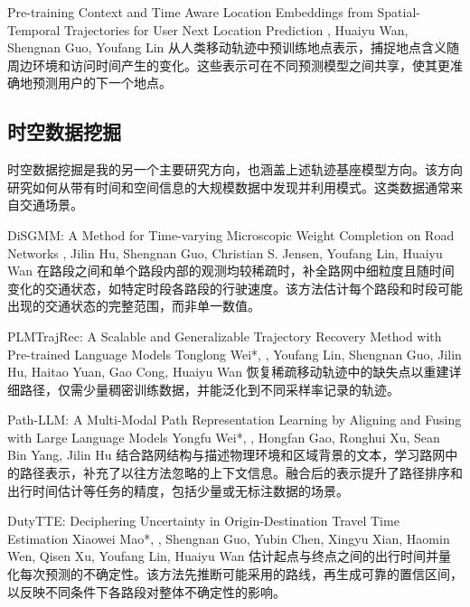 {Pre-training Context and Time Aware Location Embeddings from Spatial-Temporal Trajectories for User Next Location Prediction}
{\me, Huaiyu Wan, Shengnan Guo, Youfang Lin}
{从人类移动轨迹中预训练地点表示，捕捉地点含义随周边环境和访问时间产生的变化。这些表示可在不同预测模型之间共享，使其更准确地预测用户的下一个地点。}

\subsection*{时空数据挖掘}
时空数据挖掘是我的另一个主要研究方向，也涵盖上述轨迹基座模型方向。该方向研究如何从带有时间和空间信息的大规模数据中发现并利用模式。这类数据通常来自交通场景。

{DiSGMM: A Method for Time-varying Microscopic Weight Completion on Road Networks}
{\me, Jilin Hu, Shengnan Guo, Christian S. Jensen, Youfang Lin, Huaiyu Wan}
{在路段之间和单个路段内部的观测均较稀疏时，补全路网中细粒度且随时间变化的交通状态，如特定时段各路段的行驶速度。该方法估计每个路段和时段可能出现的交通状态的完整范围，而非单一数值。}

{PLMTrajRec: A Scalable and Generalizable Trajectory Recovery Method with Pre-trained Language Models}
{Tonglong Wei*, \me*, Youfang Lin, Shengnan Guo, Jilin Hu, Haitao Yuan, Gao Cong, Huaiyu Wan}
{恢复稀疏移动轨迹中的缺失点以重建详细路径，仅需少量稠密训练数据，并能泛化到不同采样率记录的轨迹。}

{Path-LLM: A Multi-Modal Path Representation Learning by Aligning and Fusing with Large Language Models}
{Yongfu Wei*, \me*, Hongfan Gao, Ronghui Xu, Sean Bin Yang, Jilin Hu}
{结合路网结构与描述物理环境和区域背景的文本，学习路网中的路径表示，补充了以往方法忽略的上下文信息。融合后的表示提升了路径排序和出行时间估计等任务的精度，包括少量或无标注数据的场景。}

{DutyTTE: Deciphering Uncertainty in Origin-Destination Travel Time Estimation}
{Xiaowei Mao*, \me*, Shengnan Guo, Yubin Chen, Xingyu Xian, Haomin Wen, Qisen Xu, Youfang Lin, Huaiyu Wan}
{估计起点与终点之间的出行时间并量化每次预测的不确定性。该方法先推断可能采用的路线，再生成可靠的置信区间，以反映不同条件下各路段对整体不确定性的影响。}

